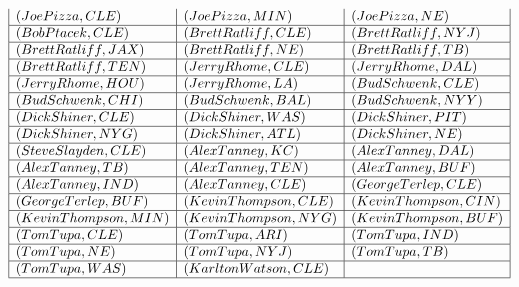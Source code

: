 \documentclass{ximera}
\begin{document}
\begin{center}
\[\begin{array}{|l|l|l|}
(Joe Pizza, CLE) & (Joe Pizza, MIN) & (Joe Pizza, NE) \\\hline 
(Bob Ptacek, CLE) & (Brett Ratliff, CLE) & (Brett Ratliff, NYJ) \\\hline 
(Brett Ratliff, JAX) & (Brett Ratliff, NE) & (Brett Ratliff, TB) \\\hline 
(Brett Ratliff, TEN) & (Jerry Rhome, CLE) & (Jerry Rhome, DAL) \\\hline 
(Jerry Rhome, HOU) & (Jerry Rhome, LA) & (Bud Schwenk, CLE) \\\hline 
(Bud Schwenk, CHI) & (Bud Schwenk, BAL) & (Bud Schwenk, NYY) \\\hline 
(Dick Shiner, CLE) & (Dick Shiner, WAS) & (Dick Shiner, PIT) \\\hline 
(Dick Shiner, NYG) & (Dick Shiner, ATL) & (Dick Shiner, NE) \\\hline 
(Steve Slayden, CLE) & (Alex Tanney, KC) & (Alex Tanney, DAL) \\\hline 
(Alex Tanney, TB) & (Alex Tanney, TEN) & (Alex Tanney, BUF) \\\hline 
(Alex Tanney, IND) & (Alex Tanney, CLE) & (George Terlep, CLE) \\\hline 
(George Terlep, BUF) & (Kevin Thompson, CLE) & (Kevin Thompson, CIN) \\\hline 
(Kevin Thompson, MIN) & (Kevin Thompson, NYG) & (Kevin Thompson, BUF) \\\hline 
(Tom Tupa, CLE) & (Tom Tupa, ARI) & (Tom Tupa, IND) \\\hline
(Tom Tupa, NE) & (Tom Tupa, NYJ) & (Tom Tupa, TB) \\\hline
(Tom Tupa, WAS) & (Karlton Watson, CLE) &    \\\hline
\end{array}
\]
\end{center}



\quad \\
\end{document}
